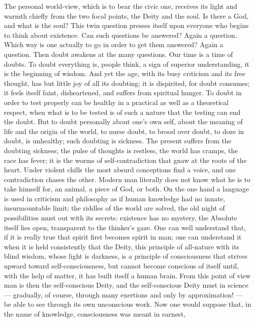 \documentclass[12pt,a4paper,openany]{book}
\newcommand{\opage}[1]{\marginnote{\footnotesize\textit{[#1]}}}
\begin{document}
The personal world-view, which is to bear the
civic one, receives its light and warmth chiefly from the
two focal points, the Deity and the soul. Is there a
God, and what is the soul? This twin question presses
itself upon everyone who begins to think about existence.
Can such questions be answered? Again a
question. Which way is one actually to go in order to
get them answered? Again a question. Then
doubt awakens at the many questions. Our time is a time of doubts.
To doubt everything is, people think, a sign of
superior understanding, it is the beginning of wisdom. And
yet the age, with its busy criticism and its free
thought, has but little joy of all its doubting; it is dispirited,
for doubt consumes; it feels itself faint, disheartened, and suffers
from spiritual hunger. To doubt in order to test properly can be healthy
in a practical as well as a theoretical respect, when
what is to be tested is of such a nature that the testing can
end the doubt. But to doubt personally about one's own self,
about the meaning of life and the origin of the world, to nurse doubt,
to brood over doubt, to doze in doubt, is unhealthy; such
doubting is sickness. The present suffers from the doubting sickness; the
pulse of thoughts is restless, the world has cramps, the race has
fever; it is the worms of self-contradiction that gnaw at the roots
of the heart. Under violent chills the most absurd
conceptions find a voice, and one contradiction chases the
other. Modern man literally does not know
what he is to take himself for, an animal, a piece of God,
or both. On the one hand a language is used
in criticism and philosophy as if human knowledge had
\setcounter{footnote}{0}%
\opage{8}no innate, insurmountable limit; the riddles of the world
are solved, the old night of possibilities must out with its secrets:
existence has no mystery, the Absolute
itself lies open, transparent to the thinker's
gaze. One can well understand that, if it is really
true that spirit first becomes spirit in man; one
can understand it when it is held consistently that the Deity,
this principle of all-nature with its blind wisdom,
whose light is darkness, is a principle of consciousness that
strives upward toward self-consciousness, but cannot become conscious of
itself until, with the help of matter, it has built
itself a human brain. From this point of view man
is then the self-conscious Deity, and the self-conscious
Deity must in science --- gradually, of course,
through many exertions and only by approximation! ---
be able to see through its own unconscious work. Now
one would suppose that, in the name of knowledge, consciousness was meant in earnest,
\end{document}
